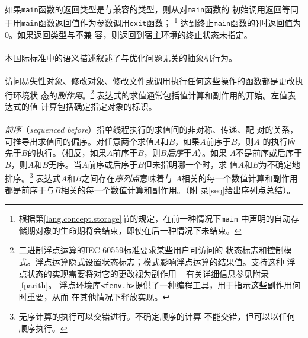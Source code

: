 \paragraph{}
如果\texttt{main}函数的返回类型是与兼容的类型，则从对\texttt{main}函数的
初始调用返回等同于用\texttt{main}函数返回值作为参数调用\texttt{exit}函数；
\footnote{根据第\ref{lang.concept.storage}节的规定，在前一种情况下\texttt{main}
中声明的自动存储期对象的生命期将会结束，即使在后一种情况下未结束。}
达到终止\texttt{main}函数的\texttt{\}}时返回值为$0$。如果返回类型与不兼
容，则返回到宿主环境的终止状态未指定。


\paragraph{}
本国际标准中的语义描述叙述了与优化问题无关的抽象机行为。

\paragraph{}
访问易失性对象、修改对象、修改文件或调用执行任何这些操作的函数都是更改执行环境状
态的\textit{副作用}。\footnote{二进制浮点运算的IEC 60559标准要求某些用户可访问的
状态标志和控制模式。浮点运算隐式设置状态标志；模式影响浮点运算的结果值。支持这种
浮点状态的实现需要将对它的更改视为副作用 -- 有关详细信息参见附录\ref{fparith}。
浮点环境库\texttt{<fenv.h>}提供了一种编程工具，用于指示这些副作用何时重要，从而
在其他情况下释放实现。} 表达式的求值通常包括值计算和副作用的开始。左值表达式的值
计算包括确定指定对象的标识。

\paragraph{}
\textit{前序}（\textit{sequenced before}）指单线程执行的求值间的非对称、传递、配
对的关系，可推导出求值间的偏序。对任意两个求值$A$和$B$，如果$A$前序于$B$，则$A$
的执行应先于$B$的执行。（相反，如果$A$前序于$B$，则$B$\textit{后序}于$A$）。如果
$A$不是前序或后序于$B$，则$A$和$B$无序。当$A$前序或后序于$B$但未指明哪一个时，求
值$A$和$B$为不确定地排序。\footnote{无序计算的执行可以交错进行。不确定顺序的计算
不能交错，但可以以任何顺序执行。} 表达式$A$和$B$之间存在\textit{序列点}意味着与
$A$相关的每一个数值计算和副作用都是前序于与$B$相关的每一个数值计算和副作用。（附
录\ref{seq}给出序列点总结）。

